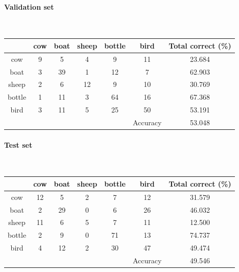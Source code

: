 \documentclass[fleqn]{article}
\newcommand{\myparagraph}[1]{\paragraph{#1}\mbox{}\\}
\begin{document}
\myparagraph{Validation set}

\begin{center}
  \begin{longtable}{ c | c | c | c | c | c | c}
  	\multicolumn{1}{c}{} &
	\multicolumn{1}{c}{cow} & 
	\multicolumn{1}{c}{boat } & 
	\multicolumn{1}{c}{sheep } &
	\multicolumn{1}{c}{bottle } & 
	\multicolumn{1}{c}{bird } &
	\multicolumn{1}{c}{Total correct (\%) }\\
    \hline
    cow       &  9   &    5    &    4   &    9    &     11      &   23.684\\\hline 
    boat      &  3   &   39    &    1   &   12    &      7      &   62.903\\\hline
    sheep     &  2   &    6    &   12   &    9    &     10      &   30.769\\\hline
    bottle    &  1   &   11    &    3   &   64    &     16      &   67.368\\\hline
    bird      &  3   &   11    &    5   &   25    &     50      &   53.191\\\hline
              &      &         &        &         &   Accuracy 	&   53.048\\\hline
  \end{longtable}
\end{center}

\myparagraph{Test set}

\begin{center}
  \begin{longtable}{ c | c | c | c | c | c | c}
  	\multicolumn{1}{c}{} &
	\multicolumn{1}{c}{cow} & 
	\multicolumn{1}{c}{boat } & 
	\multicolumn{1}{c}{sheep } &
	\multicolumn{1}{c}{bottle } & 
	\multicolumn{1}{c}{bird } &
	\multicolumn{1}{c}{Total correct (\%) }\\
    \hline
    cow       &  12    &    5    &    2     &   7    &   12     &   31.579\\\hline 
    boat      &  2     &   29    &    0     &   6    &   26     &   46.032\\\hline
    sheep     &  11    &    6    &    5     &   7    &   11     &   12.500\\\hline
    bottle    &  2     &    9    &    0     &   71   &   13     &   74.737\\\hline
    bird      &  4     &    12   &    2     &   30   &   47     &  49.474\\\hline
              &        &         &          &        & Accuracy & 49.546\\\hline
  \end{longtable}
\end{center}
\end{document}
